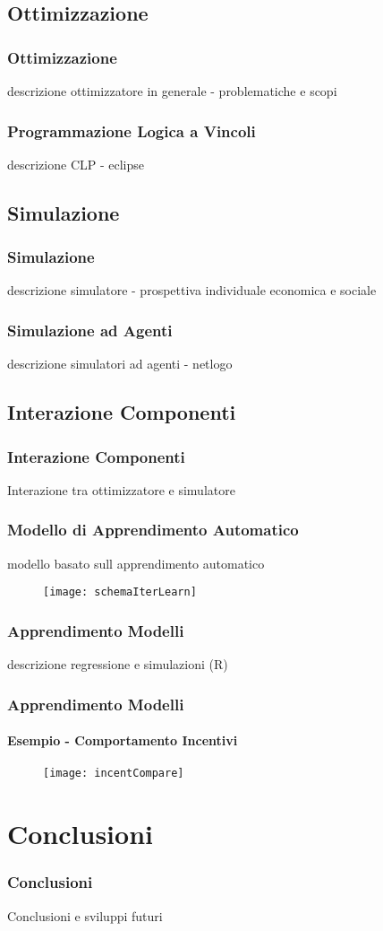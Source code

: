 \documentclass{beamer}
\begin{document}
\subsection{Ottimizzazione}
	\begin{frame}
		\frametitle{Ottimizzazione}
		descrizione ottimizzatore in generale - problematiche e scopi
  	\end{frame}
  	\begin{frame}
		\frametitle{Programmazione Logica a Vincoli}
		descrizione CLP - eclipse
  	\end{frame}
\subsection{Simulazione}
	\begin{frame}
		\frametitle{Simulazione}
		descrizione simulatore - prospettiva individuale economica e sociale
  	\end{frame}
  	\begin{frame}
		\frametitle{Simulazione ad Agenti}
		descrizione simulatori ad agenti - netlogo
  	\end{frame}
\subsection{Interazione Componenti}
	\begin{frame}
		\frametitle{Interazione Componenti}
		Interazione tra ottimizzatore e simulatore
  	\end{frame}
  	\begin{frame}
		\frametitle{Modello di Apprendimento Automatico}
		modello basato sull apprendimento automatico
		\begin{figure}[htb]
			\centering
			\texttt{[image: schemaIterLearn]}
		  	\label{schemaIterLearn}
		\end{figure}
	\end{frame}
	\begin{frame}
		\frametitle{Apprendimento Modelli}
		descrizione regressione e simulazioni (R)
  	\end{frame}
  	\begin{frame}
		\frametitle{Apprendimento Modelli}
		\framesubtitle{Esempio - Comportamento Incentivi}
		\begin{figure}[hbt]
			\centering
			\texttt{[image: incentCompare]}
			\label{incentCompare}
		\end{figure}
  	\end{frame}
  
\section{Conclusioni}
	\begin{frame}
		\frametitle{Conclusioni}
		Conclusioni e sviluppi futuri
	\end{frame}
  
\end{document}
